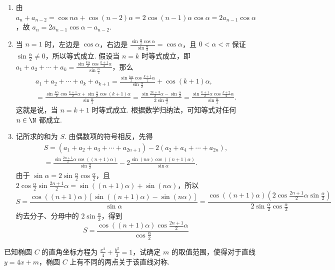 \begin{solution}
\begin{enumerate}
\item 由 \(a_{n}+a_{n-2}=\cos n\alpha+\cos(n-2)\alpha=2\cos(n-1)\alpha\cos\alpha=2a_{n-1}\cos\alpha\)，故 \(a_{n}=2a_{n-1}\cos\alpha-a_{n-2}\).

\item 当 \(n=1\) 时，左边是 \(\cos\alpha\)，右边是 \(\frac{\sin\frac{\alpha}{2}\cos\alpha}{\sin\frac{\alpha}{2}}=\cos\alpha\)，且 \(0<\alpha<\pi\) 保证 \(\sin\frac{\alpha}{2}\ne0\)，所以等式成立. 假设当 \(n=k\) 时等式成立，即 \(a_{1}+a_{2}+\cdots+a_{k}=\frac{\sin\frac{k\alpha}{2}\cos\frac{k+1}{2}\alpha}{\sin\frac{\alpha}{2}}\)，那么
\[
\begin{gathered}
a_{1}+a_{2}+\cdots+a_{k}+a_{k+1}=\frac{\sin\frac{k\alpha}{2}\cos\frac{k+1}{2}\alpha}{\sin\frac{\alpha}{2}}+\cos(k+1)\alpha,\\
=\frac{\sin\frac{k\alpha}{2}\cos\frac{k+1}{2}\alpha+\sin\frac{\alpha}{2}\cos(k+1)\alpha}{\sin\frac{\alpha}{2}}=\frac{\sin\frac{2k+3}{2}\alpha-\sin\frac{\alpha}{2}}{2\sin\frac{\alpha}{2}}=\frac{\sin\frac{k+1}{2}\alpha\cos\frac{k+2}{2}\alpha}{\sin\frac{\alpha}{2}}.
\end{gathered}
\] 这就是说，当 \(n=k+1\) 时等式成立. 根据数学归纳法，可知等式对任何 \(n\in\N\) 都成立.

\item 记所求的和为 \(S\). 由偶数项的符号相反，先得
\[
\begin{gathered}
S=(a_{1}+a_{2}+a_{3}+\cdots+a_{2n+1})-2(a_{2}+a_{4}+\cdots+a_{2n}),\\
=\frac{\sin\frac{2n+1}{2}\alpha\cos\left((n+1)\alpha\right)}{\sin\frac{\alpha}{2}}-2\frac{\sin(n\alpha)\cos\left((n+1)\alpha\right)}{\sin\alpha}.
\end{gathered}
\]
由于 \(\sin\alpha=2\sin\frac{\alpha}{2}\cos\frac{\alpha}{2}\)，且 \(2\cos\frac{\alpha}{2}\sin\frac{2n+1}{2}\alpha=\sin\left((n+1)\alpha\right)+\sin(n\alpha)\)，所以
\[
S=\frac{\cos\left((n+1)\alpha\right)\left[\sin\left((n+1)\alpha\right)-\sin(n\alpha)\right]}{\sin\alpha}=\frac{\cos\left((n+1)\alpha\right)\left(2\cos\frac{2n+1}{2}\alpha\sin\frac{\alpha}{2}\right)}{2\sin\frac{\alpha}{2}\cos\frac{\alpha}{2}}
\]
约去分子、分母中的 \(2\sin\frac{\alpha}{2}\)，得到
\[
S=\frac{\cos\left((n+1)\alpha\right)\cos\frac{2n+1}{2}\alpha}{\cos\frac{\alpha}{2}}
\]
\end{enumerate}
\end{solution}

\begin{problem}

已知椭圆 \(C\) 的直角坐标方程为 \(\frac{x^2}{4} + \frac{y^2}{3} = 1\)，试确定 \(m\) 的取值范围，使得对于直线 \(y = 4x + m\)，椭圆 \(C\) 上有不同的两点关于该直线对称.
\end{problem}

